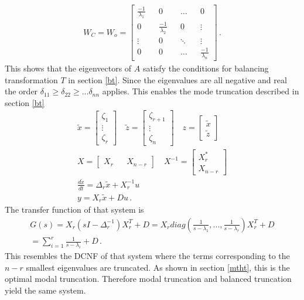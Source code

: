 \begin{gather}
W_C = W_o = \begin{bmatrix}
\frac{-1}{\lambda_1} && 0 && \hdots && 0 \\
0 && \frac{-1}{\lambda_2}&& 0 && \vdots \\
\vdots && 0 && \ddots && \vdots \\
0 && 0 && \hdots && \frac{-1}{\lambda_n}
\end{bmatrix} \,.
\end{gather}
This shows that the eigenvectors of \(A\) satisfy the conditions for balancing transformation \(T\) in section \ref{bt}.
Since the eigenvalues are all negative and real the order \(\delta_{11} \geq \delta_{22} \geq ...  \delta_{nn}\) applies.
This enables the mode truncation described in section \ref{bt}
\begin{gather}
\tilde{x} = \begin{bmatrix}
\zeta_1 \\
\vdots \\
\zeta_r
\end{bmatrix} \quad 
\tilde{z} = \begin{bmatrix}
\zeta_{r+1} \\
\vdots \\
\zeta_n
\end{bmatrix} \quad
z = \begin{bmatrix}
\tilde{x} \\
\tilde{z}
\end{bmatrix}\\
X= \begin{bmatrix}
X_r && X_{n-r}
\end{bmatrix} \quad
X^{-1} = \begin{bmatrix}
X_r^{*} \\
X_{n-r}
\end{bmatrix} \\
\frac{d\tilde{x}}{dt} = \Delta_r \tilde{x} + X^{-1}_ru \\
y = X_r\tilde{x} + Du \,.
\end{gather}
The transfer function of that system is
\begin{gather}
G(s) = X_r(sI - \Delta_r^{-1})X_r^{T}+D = X_r diag(\frac{1}{s-\lambda_1}, ..., \frac{1}{s-\lambda_r})X_r^{T}+D \\
= \sum_{i=1}^{r} \frac{1}{s-\lambda_i} + D \,.
\end{gather}
This resembles the DCNF of that system where the terms corresponding to the \(n-r\) smallest eigenvalues are truncated.
As shown in section \ref{mtht}, this is the optimal modal truncation.
Therefore modal truncation and balanced truncation yield the same system.




